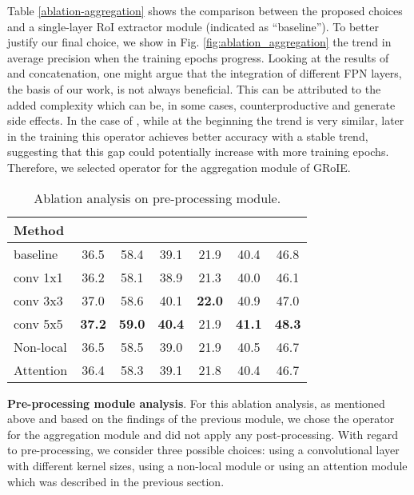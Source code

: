 \documentclass[10pt,conference,a4paper]{IEEEtran}
\newcommand{\dquote}[1]{``#1''}
\begin{document}
Table \ref{ablation-aggregation} shows the comparison between the proposed choices and a single-layer RoI extractor module (indicated as \dquote{baseline}).
To better justify our final choice, we show in Fig. \ref{fig:ablation_aggregation} the trend in average precision when the training epochs progress.
Looking at the results of  and concatenation, one might argue that the integration of different FPN layers, the basis of our work, is not always beneficial.
This can be attributed to the added complexity which can be, in some cases, counterproductive and generate side effects.
In the case of , while at the beginning the trend is very similar, later in the training this operator achieves better accuracy with a stable trend, suggesting that this gap could potentially increase with more training epochs.
Therefore, we selected  operator for the aggregation module of GRoIE.



\begin{table}
  \begin{center}
    \begin{tabular}{l|c|c|c|c|c|c}
      Method &  &  &  &  &  &  \\
      \hline\hline
      baseline    & 36.5 & 58.4 & 39.1 & 21.9 & 40.4 & 46.8 \\
conv 1x1    & 36.2 & 58.1 & 38.9 & 21.3 & 40.0 & 46.1 \\
conv 3x3    & 37.0 & 58.6 & 40.1 & \textbf{22.0} & 40.9 & 47.0 \\
conv 5x5    & \textbf{37.2} & \textbf{59.0} & \textbf{40.4} & 21.9 & \textbf{41.1} & \textbf{48.3} \\
Non-local   & 36.5 & 58.5 & 39.0 & 21.9 & 40.5 & 46.7 \\
Attention   & 36.4 & 58.3 & 39.1 & 21.8 & 40.4 & 46.7 \\
    \end{tabular}
  \end{center}
  \caption{Ablation analysis on pre-processing module.}
  \label{ablation-preprocessing}
\end{table}

\noindent\textbf{Pre-processing module analysis}.
For this ablation analysis, as mentioned above and based on the findings of the previous module, we chose the  operator for the aggregation module and did not apply any post-processing.
With regard to pre-processing, we consider three possible choices: using a convolutional layer with different kernel sizes, using a non-local module or using an attention module which was described in the previous section.
\end{document}
